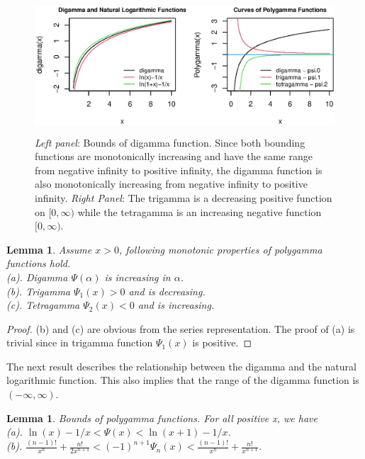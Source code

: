 \documentclass{ps}
\theoremstyle{plain}%
\newtheorem{lemma}[theorem]{Lemma}
\theoremstyle{definition}
\theoremstyle{remark}
\begin{document}
\begin{figure}[h!]
	\centering	\includegraphics[width=12cm,height=5cm]{Figure03_Digamma_curves.eps}
	\caption{\emph{Left panel}: Bounds of digamma function. Since both bounding functions are monotonically increasing and have the same range from negative infinity to positive infinity, the digamma function is also monotonically increasing from negative infinity to positive infinity. \emph{Right Panel}: The trigamma is a decreasing positive function on $[0, \infty)$ while the tetragamma is an increasing negative function $[0, \infty)$.}
	\label{Fig03:Digamma_curves}
\end{figure}

\begin{lemma}\label{lemma3.1}
	Assume $x > 0$, following monotonic properties of polygamma functions hold.\\
	(a). Digamma $\Psi(\alpha)$ is increasing in $\alpha$.\\
	(b). Trigamma $\Psi_1(x) > 0$ and is decreasing.\\
	(c). Tetragamma $\Psi_2(x) < 0$ and is increasing.
\end{lemma}

\begin{proof}
	(b) and (c) are obvious from the series representation. The proof of (a) is trivial since in trigamma function $\Psi_1(x)$  is positive. 
\end{proof}

The next result describes the relationship between the digamma and the natural logarithmic function. This also implies that the range of the digamma function is $(-\infty, \infty)$.

\begin{lemma}\label{lemma3.2}
	Bounds of polygamma functions. For all positive x, we have \\
	(a). $\ln(x)-1/x < \Psi(x) < \ln(x+1) - 1/x$.\\
	(b). $\frac{(n-1)!}{x^n}+\frac{n!}{2x^{n+1}} < (-1)^{n+1}\Psi_n(x) < \frac{(n-1)!}{x^n}+\frac{n!}{x^{n+1}}$.
\end{lemma}
\end{document}

